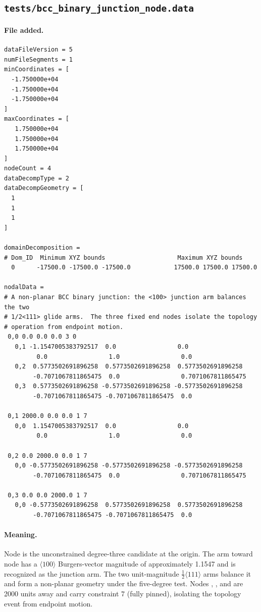\documentclass[11pt]{article}
\newcommand{\code}[1]{\texttt{\detokenize{#1}}}
\begin{document}
\subsection{\texttt{tests/bcc\_binary\_junction\_node.data}}

\paragraph{File added.}

\begin{lstlisting}[style=data]
dataFileVersion = 5
numFileSegments = 1
minCoordinates = [
  -1.750000e+04
  -1.750000e+04
  -1.750000e+04
]
maxCoordinates = [
   1.750000e+04
   1.750000e+04
   1.750000e+04
]
nodeCount = 4
dataDecompType = 2
dataDecompGeometry = [
  1
  1
  1
]

domainDecomposition =
# Dom_ID  Minimum XYZ bounds                    Maximum XYZ bounds
  0      -17500.0 -17500.0 -17500.0            17500.0 17500.0 17500.0

nodalData =
# A non-planar BCC binary junction: the <100> junction arm balances the two
# 1/2<111> glide arms.  The three fixed end nodes isolate the topology
# operation from endpoint motion.
 0,0 0.0 0.0 0.0 3 0
   0,1 -1.1547005383792517  0.0                 0.0
         0.0                 1.0                 0.0
   0,2  0.5773502691896258  0.5773502691896258  0.5773502691896258
        -0.7071067811865475  0.0                 0.7071067811865475
   0,3  0.5773502691896258 -0.5773502691896258 -0.5773502691896258
        -0.7071067811865475 -0.7071067811865475  0.0

 0,1 2000.0 0.0 0.0 1 7
   0,0  1.1547005383792517  0.0                 0.0
         0.0                 1.0                 0.0

 0,2 0.0 2000.0 0.0 1 7
   0,0 -0.5773502691896258 -0.5773502691896258 -0.5773502691896258
        -0.7071067811865475  0.0                 0.7071067811865475

 0,3 0.0 0.0 2000.0 1 7
   0,0 -0.5773502691896258  0.5773502691896258  0.5773502691896258
        -0.7071067811865475 -0.7071067811865475  0.0
\end{lstlisting}

\paragraph{Meaning.}
Node \code{0,0} is the unconstrained degree-three candidate at the origin.
The arm toward node \code{0,1} has a $\langle100\rangle$ Burgers-vector
magnitude of approximately 1.1547 and is recognized as the junction arm.  The
two unit-magnitude $\tfrac12\langle111\rangle$ arms balance it and form a
non-planar geometry under the five-degree test.  Nodes \code{0,1},
\code{0,2}, and \code{0,3} are 2000 units away and carry constraint 7
(fully pinned), isolating the topology event from endpoint motion.
\end{document}
